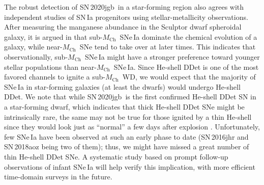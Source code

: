 \documentclass[twocolumn]{aastex631}
\newcommand{\sn}{SN\,2020jgb}
\newcommand{\Mch}{$M_\mathrm{Ch}$}
\newcommand{\adam}[1]{\textcolor{red}{[AAM: #1]}}
\newcommand{\chang}[1]{\textcolor{blue}{[Chang: #1]}}
\begin{document}
The robust detection of \sn\ in a star-forming region also agrees with independent studies of SN\,Ia progenitors using stellar-metallicity observations. After measuring the manganese abundance in the Sculptor dwarf spheroidal galaxy, it is argued in \citet{de_los_reyes_manganese_2020} that sub-\Mch\ SNe\,Ia dominate the chemical evolution of a galaxy, while near-\Mch\ SNe tend to take over at later times. This indicates that observationally, sub-\Mch\ SNe\,Ia might have a stronger preference toward younger stellar populations than near-\Mch\ SNe\,Ia.
Since He-shell DDet is one of the most favored channels to ignite a sub-\Mch\ WD, we would expect that the majority of SNe\,Ia in star-forming galaxies (at least the dwarfs) would undergo He-shell DDet. We note that while \sn\ is the first confirmed He-shell DDet SN in a star-forming dwarf, which indicates that thick He-shell DDet SNe might be intrinsically rare, the same may not be true for those ignited by a thin He-shell since they would look just as  ``normal'' a few days after explosion \citep{Ni_2022}. Unfortunately, few SNe\,Ia have been observed at such an early phase to date (SN\,2016jhr and SN\,2018aoz being two of them); thus, we might have missed a great number of thin He-shell DDet SNe. A systematic study based on prompt follow-up observations of infant SNe\,Ia will help verify this implication, with more efficient time-domain surveys in the future.
\end{document}
